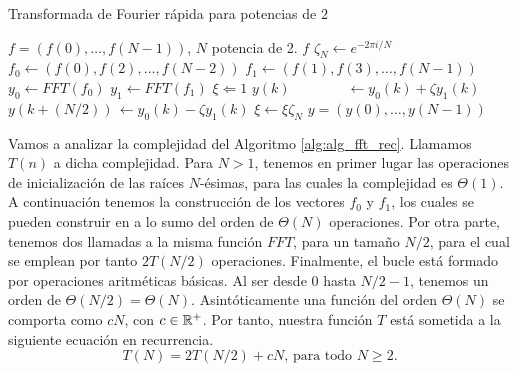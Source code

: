 \documentclass{article}
\begin{document}
\begin{algorithm}
    \caption{Transformada de Fourier rápida para potencias de $2$}
    \label{alg:alg_fft_rec}
    \begin{algorithmic}
        \REQUIRE $f = (f(0),\dots,f(N-1))$, $N$ potencia de 2.
            \RETURN $f$ 
        \ELSE
            \STATE $\zeta_N \leftarrow e^{-2\pi i/N}$ %
            \STATE $f_0 \leftarrow (f(0),f(2),\dots,f(N-2))$
            \STATE $f_1 \leftarrow (f(1),f(3),\dots,f(N-1))$
            \STATE $y_0 \leftarrow FFT(f_0)$ 
            \STATE $y_1 \leftarrow FFT(f_1)$
            \STATE $\xi \Leftarrow 1$ %
                \STATE $y(k) \quad \quad \quad \quad \leftarrow y_0(k) + \zeta y_1(k)$ 
                \STATE $y(k+(N/2)) \, \leftarrow y_0(k)-\zeta y_1(k)$ 
                \STATE $\xi \leftarrow \xi \zeta_N$ 
            \ENDFOR
            \RETURN $y = (y(0),\dots,y(N-1))$ 
        \ENDIF
    \end{algorithmic}
\end{algorithm}

Vamos a analizar la complejidad del Algoritmo \ref{alg:alg_fft_rec}. Llamamos $T(n)$ a dicha complejidad. Para $N > 1$, tenemos en primer lugar las operaciones de inicialización de las raíces $N$-ésimas, para las cuales la complejidad es $\Theta(1)$. A continuación tenemos la construcción de los vectores $f_0$ y $f_1$, los cuales se pueden construir en a lo sumo del orden de $\Theta(N)$ operaciones. Por otra parte, tenemos dos llamadas a la misma función $FFT$, para un tamaño $N/2$, para el cual se emplean por tanto $2T(N/2)$ operaciones. Finalmente, el bucle está formado por operaciones aritméticas básicas. Al ser desde $0$ hasta $N/2-1$, tenemos un orden de $\Theta(N/2)=\Theta(N)$. Asintóticamente una función del orden $\Theta(N)$ se comporta como $cN$, con $c \in \mathbb{R}^+$. Por tanto, nuestra función $T$ está sometida a la siguiente ecuación en recurrencia.
\[ T(N) = 2T(N/2) + cN \text{, para todo } N \ge 2. \]
\end{document}
